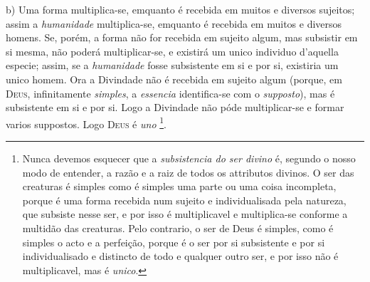 b) Uma forma multiplica-se, emquanto é recebida em muitos e diversos sujeitos; assim a \emph{humanidade} multiplica-se, emquanto é recebida em muitos e diversos homens. Se, porém, a forma não for recebida em sujeito algum, mas subsistir em si mesma, não poderá multiplicar-se, e existirá um unico individuo d'aquella especie; assim, se a \emph{humanidade} fosse subsistente em si e por si, existiria um unico homem. Ora a Divindade não é recebida em sujeito algum (porque, em \textsc{Deus}, infinitamente \emph{simples}, a \emph{essencia} identifica-se com o \emph{supposto}), mas é subsistente em si e por si. Logo a Divindade não póde multiplicar-se e formar varios suppostos. Logo \textsc{Deus} é \emph{uno} \footnote{Nunca devemos esquecer que a \emph{subsistencia do ser divino} é, segundo o nosso modo de entender, a razão e a raiz de todos os attributos divinos. O ser das creaturas é simples como é simples uma parte ou uma coisa incompleta, porque é uma forma recebida num sujeito e individualisada pela natureza, que subsiste nesse ser, e por isso é multiplicavel e multiplica-se conforme a multidão das creaturas. Pelo contrario, o ser de Deus é simples, como é simples o acto e a perfeição, porque é o ser por si subsistente e por si individualisado e distincto de todo e qualquer outro ser, e por isso não é multiplicavel, mas é \emph{unico}.}.

